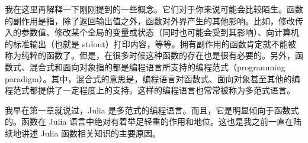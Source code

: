 我在这里再解释一下刚刚提到的一些概念。它们对于你来说可能会比较陌生。函数的副作用是指，除了返回输出值之外，函数对外界产生的其他影响。比如，修改传入的参数值、修改某个全局的变量或状态（同时也可能会受到其影响）、向计算机的标准输出（也就是 stdout）打印内容，等等。拥有副作用的函数肯定就不能被称为纯粹的函数了。但是，在很多时候这种函数的存在也是很有必要的。另外，函数式、混合式和面向对象指的都是编程语言所支持的编程范式（programming paradigm）。其中，混合式的意思是，编程语言对函数式、面向对象甚至其他的编程范式都提供了一定程度上的支持。这样的编程语言也常常被称为多范式语言。

我早在第一章就说过，Julia 是多范式的编程语言。而且，它是明显倾向于函数式的。函数在 Julia 语言中绝对有着举足轻重的作用和地位。这也是我之前一直在陆续地讲述 Julia 函数相关知识的主要原因。